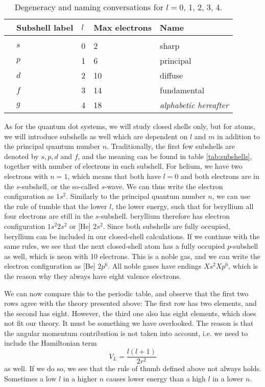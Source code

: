\begin{table}
	\caption{Degeneracy and naming conversations for $l=0$, 1, 2, 3, 4.  \vspace{2mm}}
	\begin{tabularx}{\textwidth}{R{0.3cm}XXXX} \hline\hline
		\label{tab:subshells}
		\makecell{\phantom{=}} & Subshell label & $l$ & Max electrons & Name \\ \hline \\
		& $s$ & 0 & 2 & sharp\\ 
		& $p$ & 1 & 6 & principal\\
		& $d$ & 2 & 10 & diffuse \\
		& $f$ & 3 & 14 & fundamental \\
		& $g$ & 4 & 18 & \textit{alphabetic hereafter} \\ \hline\hline
	\end{tabularx}
\end{table}

As for the quantum dot systems, we will study closed shells only, but for atoms, we will introduce subshells as well which are dependent on $l$ and $m$ in addition to the principal quantum number $n$. Traditionally, the first few subshells are denoted by $s, p, d$ and $f$, and the meaning can be found in table \eqref{tab:subshells}, together with number of electrons in each subshell. For helium, we have two electrons with $n=1$, which means that both have $l=0$ and both electrons are in the $s$-subshell, or the so-called $s$-wave. We can thus write the electron configuration as $1s^2$. Similarly to the principal quantum number $n$, we can use the rule of tumble that the lower $l$, the lower energy, such that for beryllium all four electrons are still in the $s$-subshell. beryllium therefore has electron configuration $1s^2 2s^2$ or [He] $2s^2$. Since both subshells are fully occupied, beryllium can be included in our closed-shell calculations. If we continue with the same rules, we see that the next closed-shell atom has a fully occupied $p$-subshell as well, which is neon with 10 electrons. This is a noble gas, and we can write the electron configuration as [Be] $2p^6$. All noble gases have endings $Xs^2 Xp^6$, which is the reason why they always have eight valence electrons.

We can now compare this to the periodic table, and observe that the first two rows agree with the theory presented above: The first row has two elements, and the second has eight. However, the third one also has eight elements, which does not fit our theory. It must be something we have overlooked. The reason is that the angular momentum contribution is not taken into account, i.e. we need to include the Hamiltonian term
\begin{equation}
V_L=\frac{l(l+1)}{2r^2}
\end{equation}
as well. If we do so, we see that the rule of thumb defined above not always holds. Sometimes a low $l$ in a higher $n$ causes lower energy than a high $l$ in a lower $n$.

